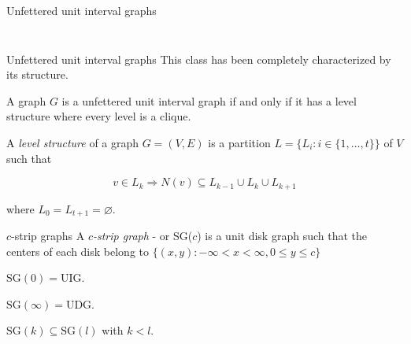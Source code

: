 \begin{frame}{Unfettered unit interval graphs}
\begin{columns}
\begin{column}{0.5\textwidth}
\begin{columns}
\begin{column}{0.5\textwidth}
\begin{figure}
\begin{tikzpicture}[scale=1.5]
\end{tikzpicture}
\label{fig:muigK13}
\end{figure}
\end{column}
\end{columns}

\end{column}
\end{columns}

\end{frame}

\begin{frame}{Unfettered unit interval graphs}
  This class has been completely characterized by its structure.

  \begin{theorem}[Hayashi]
      A graph $G$ is a unfettered unit interval graph if and only if it has a level structure where every level is a clique.
  \end{theorem}
  \vfill
  \begin{definition}
    A \emph{level structure} of a graph $G = (V,E)$ is a partition $L = \{L_i : i \in \{1,\dots, t\}\}$ of $V$ such that

    $$v \in L_k \Rightarrow N(v) \subseteq L_{k-1} \cup L_{k} \cup L_{k+1}$$

    where $L_0 = L_{t+1} = \varnothing$.
  \end{definition}
\end{frame}

\begin{frame}{$c$-strip graphs}
  A \emph{$c$-strip graph} - or SG($c$) is a unit disk graph such that the centers of each disk belong to $\{(x,y) : -\infty < x < \infty, 0 \leq y \leq c\}$
  \vfill
  \pause
  \begin{remark}
    $\text{SG}(0) = \text{UIG}$.
  \end{remark}
  \begin{remark}
    $\text{SG}(\infty) = \text{UDG}$.
  \end{remark}
  \begin{remark}
    $\text{SG}(k) \subseteq \text{SG}(l)$ with $k < l$.
  \end{remark}

\end{frame}

